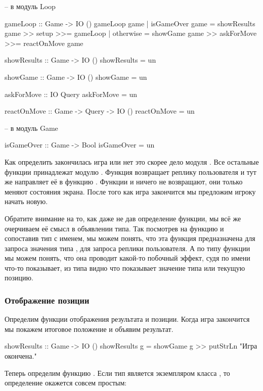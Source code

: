 \begin{code}
-- в модуль Loop

gameLoop :: Game -> IO ()
gameLoop game 
    | isGameOver game   = showResults game >> setup >>= gameLoop
    | otherwise         = showGame game >> askForMove >>= reactOnMove game


showResults :: Game -> IO ()
showResults = un

showGame :: Game -> IO ()
showGame = un

askForMove :: IO Query
askForMove = un

reactOnMove :: Game -> Query -> IO ()
reactOnMove = un

-- в модуль Game

isGameOver :: Game -> Bool
isGameOver = un
\end{code}

Как определить закончилась игра или нет это скорее дело модуля
. Все остальные функции принадлежат модулю . Функция
 возвращает реплику пользователя и тут же направляет её в
функцию . Функции  и 
ничего не возвращают, они только меняют состояния экрана. После того как
игра закончится мы предложим игроку начать новую.

Обратите внимание на то, как даже не дав определение функции, мы всё же
очерчиваем её смысл в объявлении типа. Так посмотрев на функцию
 и сопоставив тип с именем, мы можем понять, что эта
функция предназначена для запроса значения типа , для запроса
реплики пользователя. А по типу функции  мы можем понять,
что она проводит какой-то побочный эффект, судя по имени что-то
показывает, из типа видно что показывает значение типа  или
текущую позицию.

\subsubsection{Отображение позиции}

Определим функции отображения результата и позиции. Когда игра
закончится мы покажем итоговое положение и объявим результат.


\begin{code}
showResults :: Game -> IO ()
showResults g = showGame g >> putStrLn "Игра окончена."
\end{code}

Теперь определим функцию . Если тип  является
экземпляром класса , то определение окажется совсем простым:



